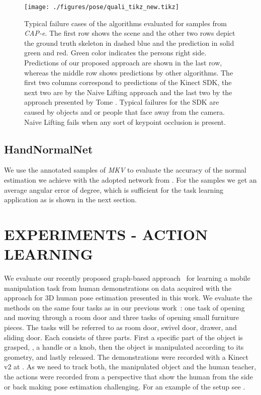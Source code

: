 \begin{figure*}
\centering
    \texttt{[image: ./figures/pose/quali\_tikz\_new.tikz]}
\caption{Typical failure cases of the algorithms evaluated for samples from \textit{CAP-e}. The first row shows the scene and the other two rows depict the ground truth skeleton in dashed blue and the prediction in solid green and red. Green color indicates the persons right side. Predictions of our proposed approach are shown in the last row, whereas the middle row shows predictions by other algorithms. The first two columns correspond to predictions of the Kinect SDK, the next two are by the Naive Lifting approach and the last two by the approach presented by Tome \etal\cite{tome_lifting_2017}. Typical failures for the SDK are caused by objects and or people that face away from the camera. Naive Lifting fails when any sort of keypoint occlusion is present. }
\label{fig:qualitative_results}
\end{figure*}


\subsection{HandNormalNet}
We use the annotated samples of \textit{MKV} to evaluate the accuracy of the normal estimation we achieve with the adopted network from \cite{zb2017hand}. For the  samples we get an average angular error of  degree, which is sufficient for the task learning application as is shown in the next section.



\section{EXPERIMENTS - ACTION LEARNING}
\label{exp_action_learning}
We evaluate our recently proposed graph-based approach~\cite{twelsche17iros} for learning a mobile manipulation task from human demonstrations on data acquired with the approach for 3D human pose estimation presented in this work. We evaluate the methods on the same four tasks as in our previous work~\cite{twelsche17iros}: one task of opening and moving through a room door and three tasks of opening small furniture pieces. The tasks will be referred to as room door, swivel door, drawer, and sliding door. Each consists of three parts. First a specific part of the object is grasped, \ie, a handle or a knob, then the object is manipulated according to its geometry, and lastly released. The demonstrations were recorded with a Kinect v2 at . As we need to track both, the manipulated object and the human teacher, the actions were recorded from a perspective that show the human from the side or back making pose estimation challenging. For an example of the setup see .   

